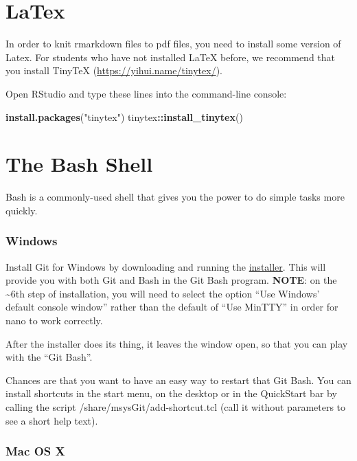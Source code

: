 \documentclass[]{book}
\newenvironment{Shaded}{\begin{snugshade}}{\end{snugshade}}
\newcommand{\KeywordTok}[1]{\textcolor[rgb]{0.13,0.29,0.53}{\textbf{#1}}}
\newcommand{\StringTok}[1]{\textcolor[rgb]{0.31,0.60,0.02}{#1}}
\newcommand{\OperatorTok}[1]{\textcolor[rgb]{0.81,0.36,0.00}{\textbf{#1}}}
\newcommand{\NormalTok}[1]{#1}
\begin{document}
\section{LaTex}\label{latex}

In order to knit rmarkdown files to pdf files, you need to install some
version of Latex. For students who have not installed LaTeX before, we
recommend that you install TinyTeX (\url{https://yihui.name/tinytex/}).

Open RStudio and type these lines into the command-line console:

\begin{Shaded}
\begin{Highlighting}[]
\KeywordTok{install.packages}\NormalTok{(}\StringTok{"tinytex"}\NormalTok{)}
\NormalTok{tinytex}\OperatorTok{::}\KeywordTok{install_tinytex}\NormalTok{() }
\end{Highlighting}
\end{Shaded}

\section{The Bash Shell}\label{the-bash-shell}

Bash is a commonly-used shell that gives you the power to do simple
tasks more quickly.

\subsubsection*{Windows}\label{windows}

Install Git for Windows by downloading and running the
\href{http://msysgit.github.io/}{installer}. This will provide you with
both Git and Bash in the Git Bash program. \textbf{NOTE}: on the
\textasciitilde{}6th step of installation, you will need to select the
option ``Use Windows' default console window'' rather than the default
of ``Use MinTTY'' in order for nano to work correctly.

After the installer does its thing, it leaves the window open, so that
you can play with the ``Git Bash''.

Chances are that you want to have an easy way to restart that Git Bash.
You can install shortcuts in the start menu, on the desktop or in the
QuickStart bar by calling the script /share/msysGit/add-shortcut.tcl
(call it without parameters to see a short help text).

\subsubsection*{Mac OS X}\label{mac-os-x}
\end{document}
